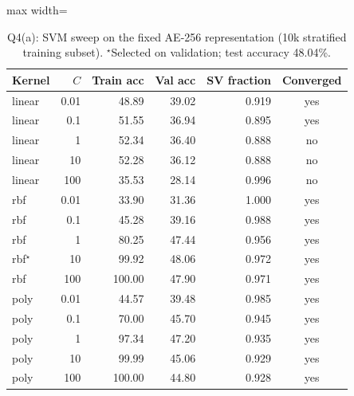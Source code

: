 \begin{table}[!tbp]\centering\footnotesize\setlength{\tabcolsep}{3pt}
\begin{adjustbox}{max width=\columnwidth}
\begin{tabular}{lrrrrc}\toprule
Kernel & $C$ & Train acc & Val acc & SV fraction & Converged \\\midrule
linear & 0.01 & 48.89 & 39.02 & 0.919 & yes \\
linear & 0.1 & 51.55 & 36.94 & 0.895 & yes \\
linear & 1 & 52.34 & 36.40 & 0.888 & no \\
linear & 10 & 52.28 & 36.12 & 0.888 & no \\
linear & 100 & 35.53 & 28.14 & 0.996 & no \\
rbf & 0.01 & 33.90 & 31.36 & 1.000 & yes \\
rbf & 0.1 & 45.28 & 39.16 & 0.988 & yes \\
rbf & 1 & 80.25 & 47.44 & 0.956 & yes \\
rbf$^\star$ & 10 & 99.92 & 48.06 & 0.972 & yes \\
rbf & 100 & 100.00 & 47.90 & 0.971 & yes \\
poly & 0.01 & 44.57 & 39.48 & 0.985 & yes \\
poly & 0.1 & 70.00 & 45.70 & 0.945 & yes \\
poly & 1 & 97.34 & 47.20 & 0.935 & yes \\
poly & 10 & 99.99 & 45.06 & 0.929 & yes \\
poly & 100 & 100.00 & 44.80 & 0.928 & yes \\
\bottomrule\end{tabular}
\end{adjustbox}
\caption{Q4(a): SVM sweep on the fixed AE-256 representation (10k stratified training subset). $^\star$Selected on validation; test accuracy 48.04\%.}\label{tab:q4a}\end{table}

